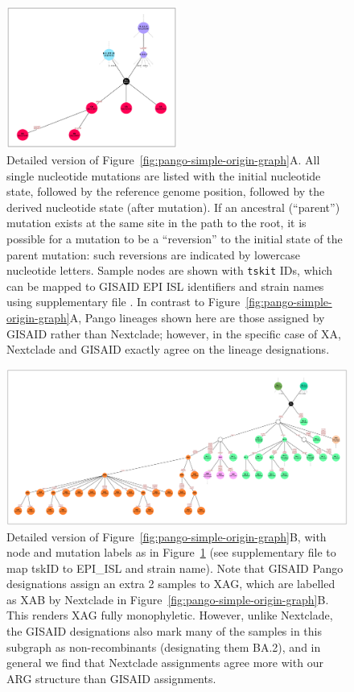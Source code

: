 \documentclass{article}
\begin{document}
\begin{figure} \centering
\includegraphics[width=0.5\textwidth]{figures/Pango_XA_gisaid_large_graph.pdf}
\caption{\label{fig:pango_XA_gisaid_graph}
Detailed version of Figure~\ref{fig:pango-simple-origin-graph}A. All single nucleotide mutations are listed
with the initial nucleotide state, followed by the reference genome position, followed by the derived
nucleotide state (after mutation). If an ancestral (``parent'') mutation exists at the same site in the path
to the root, it is possible for a mutation to be a ``reversion'' to the initial state of the parent mutation:
such reversions are indicated by lowercase nucleotide letters. Sample nodes are shown with \texttt{tskit} IDs,
which can be mapped to GISAID EPI ISL identifiers and strain names using supplementary file \protect{}. In contrast to
Figure~\ref{fig:pango-simple-origin-graph}A, Pango lineages shown here are those assigned by GISAID rather
than Nextclade; however, in the specific case of XA, Nextclade and GISAID exactly agree on the lineage designations.
}
\end{figure}

\begin{figure} \centering
\includegraphics[width=\textwidth]{figures/Pango_XAG_gisaid_large_graph.pdf}
\caption{\label{fig:pango_XAG_gisaid_graph}
Detailed version of Figure~\ref{fig:pango-simple-origin-graph}B, with node and mutation labels as in
Figure~\ref{fig:pango_XA_gisaid_graph} (see supplementary file \protect{}
to map tskID to EPI\_ISL and strain name).
Note that GISAID Pango designations assign an extra 2 samples to XAG, which are labelled as XAB
by Nextclade in Figure~\ref{fig:pango-simple-origin-graph}B. This renders XAG fully monophyletic.
However, unlike Nextclade, the GISAID designations also mark many of the samples in this subgraph
as non-recombinants (designating them BA.2), and in general we find that Nextclade assignments
agree more with our ARG structure than GISAID assignments.
}
\end{figure}
\end{document}
